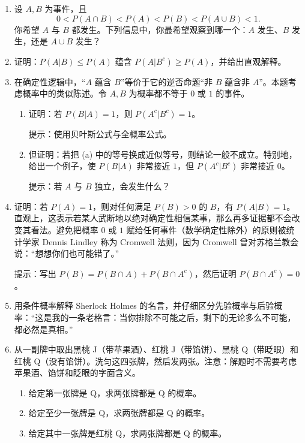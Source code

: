 \documentclass[UTF8,12pt,a4paper,fontset=fandol]{ctexart}
\begin{document}
\begin{enumerate}
  \item 设 $A,B$ 为事件，且
  \[
    0<P(A\cap B)<P(A)<P(B)<P(A\cup B)<1.
  \]
  你希望 $A$ 与 $B$ 都发生。下列信息中，你最希望观察到哪一个：$A$ 发生、$B$ 发生，还是 $A\cup B$ 发生？

  \item 证明：$P(A|B)\le P(A)$ 蕴含 $P(A|B^c)\ge P(A)$，并给出直观解释。

  \item 在确定性逻辑中，“$A$ 蕴含 $B$”等价于它的逆否命题“非 $B$ 蕴含非 $A$”。本题考虑概率中的类似陈述。令 $A,B$ 为概率都不等于 $0$ 或 $1$ 的事件。
  \begin{enumerate}
    \item 证明：若 $P(B|A)=1$，则 $P(A^c|B^c)=1$。

    提示：使用贝叶斯公式与全概率公式。
    \item 但证明：若把 (a) 中的等号换成近似等号，则结论一般不成立。特别地，给出一个例子，使 $P(B|A)$ 非常接近 $1$，但 $P(A^c|B^c)$ 非常接近 $0$。

    提示：若 $A$ 与 $B$ 独立，会发生什么？
  \end{enumerate}

  \item 证明：若 $P(A)=1$，则对任何满足 $P(B)>0$ 的 $B$，有 $P(A|B)=1$。直观上，这表示若某人武断地以绝对确定性相信某事，那么再多证据都不会改变其看法。避免把概率 $0$ 或 $1$ 赋给任何事件（数学确定性除外）的原则被统计学家 Dennis Lindley 称为 Cromwell 法则，因为 Cromwell 曾对苏格兰教会说：“想想你们也可能错了。”

  提示：写出 $P(B)=P(B\cap A)+P(B\cap A^c)$，然后证明 $P(B\cap A^c)=0$。

  \item 用条件概率解释 Sherlock Holmes 的名言，并仔细区分先验概率与后验概率：“这是我的一条老格言：当你排除不可能之后，剩下的无论多么不可能，都必然是真相。”

  \item 从一副牌中取出黑桃 J（带苹果酒）、红桃 J（带馅饼）、黑桃 Q（带眨眼）和红桃 Q（没有馅饼）。洗匀这四张牌，然后发两张。注意：解题时不需要考虑苹果酒、馅饼和眨眼的字面含义。
  \begin{enumerate}
    \item 给定第一张牌是 Q，求两张牌都是 Q 的概率。
    \item 给定至少一张牌是 Q，求两张牌都是 Q 的概率。
    \item 给定其中一张牌是红桃 Q，求两张牌都是 Q 的概率。
  \end{enumerate}


\end{enumerate}
\end{document}
